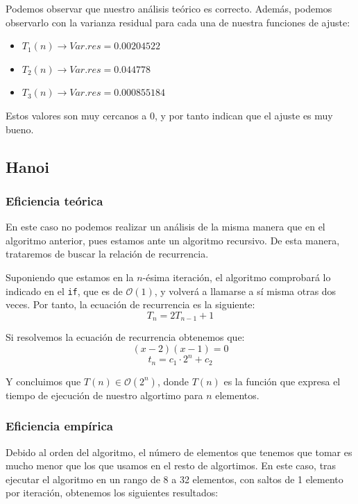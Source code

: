 \documentclass[10pt,a4paper]{article}
\begin{document}
Podemos observar que nuestro análisis teórico es correcto. Además, podemos observarlo con la varianza residual para cada una de nuestra funciones de ajuste:
\begin{itemize}
	\item \(T_1(n) \longrightarrow Var.res = 0.00204522\)
	\item \(T_2(n) \longrightarrow Var.res = 0.044778\)
	\item \(T_3(n) \longrightarrow Var.res = 0.000855184\)
\end{itemize}

Estos valores son muy cercanos a 0, y por tanto indican que el ajuste es muy bueno.
\subsection{Hanoi}


\subsubsection{Eficiencia teórica}

En este caso no podemos realizar un análisis de la misma manera que en el algoritmo anterior, pues estamos ante un algoritmo recursivo. De esta manera, trataremos de buscar la relación de recurrencia.

Suponiendo que estamos en la \(n\)-ésima iteración, el algoritmo comprobará lo indicado en el \texttt{if}, que es de \(\mathcal{O}(1)\), y volverá a llamarse a sí misma otras dos veces. Por tanto, la ecuación de recurrencia es la siguiente:
\[
	T_n = 2T_{n-1} + 1
\]

Si resolvemos la ecuación de recurrencia obtenemos que:
\[
	(x-2)(x-1) = 0
\]
\[
	t_n = c_1 \cdot 2^n + c_2
\]

Y concluimos que \(T(n) \in \mathcal{O}(2^n)\), donde \(T(n)\) es la función que expresa el tiempo de ejecución de nuestro algortimo para \(n\) elementos.

\subsubsection{Eficiencia empírica}
Debido al orden del algoritmo, el número de elementos que tenemos que tomar es mucho menor que los que usamos en el resto de algortimos. En este caso, tras ejecutar el algoritmo en un rango de 8 a 32 elementos, con saltos de 1 elemento por iteración, obtenemos los siguientes resultados:
\end{document}
